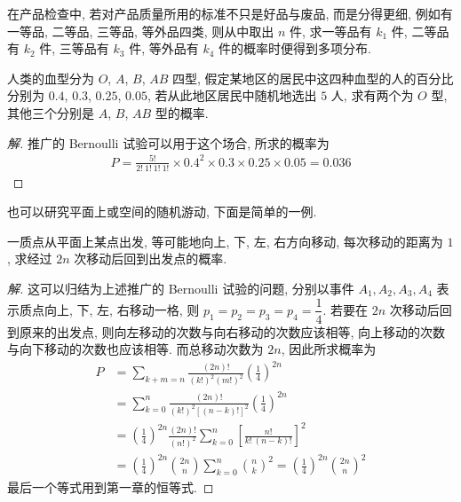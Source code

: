 \documentclass[../../main.tex]{subfiles}
\begin{document}
在产品检查中, 若对产品质量所用的标准不只是好品与废品, 而是分得更细, 例如有一等品, 二等品, 三等品, 等外品四类, 则从中取出 $n$ 件, 求一等品有 $k_1$ 件, 二等品有 $k_2$ 件, 三等品有 $k_3$ 件, 等外品有 $k_4$ 件的概率时便得到多项分布.

\begin{example}[人类血型分布]\label{example:ch02-人类血型分布}
人类的血型分为 $O$, $A$, $B$, $AB$ 四型, 假定某地区的居民中这四种血型的人的百分比分别为 $0.4$, $0.3$, $0.25$, $0.05$, 若从此地区居民中随机地选出 $5$ 人, 求有两个为 $O$ 型, 其他三个分别是 $A$, $B$, $AB$ 型的概率.

\begin{proof}[解]
推广的 Bernoulli 试验可以用于这个场合, 所求的概率为
\begin{align*}
P=\frac{5!}{2!\ 1!\ 1!\ 1!}\times 0.4^2\times 0.3\times 0.25\times 0.05=0.036
\end{align*}
\end{proof}
\end{example}

也可以研究平面上或空间的随机游动, 下面是简单的一例.

\begin{example}[平面上随机游动的返回概率]\label{example:ch02-平面随机游动返回}
一质点从平面上某点出发, 等可能地向上, 下, 左, 右方向移动, 每次移动的距离为 $1$, 求经过 $2n$ 次移动后回到出发点的概率.

\begin{proof}[解]
这可以归结为上述推广的 Bernoulli 试验的问题, 分别以事件 $A_1, A_2, A_3, A_4$ 表示质点向上, 下, 左, 右移动一格, 则 $p_1=p_2=p_3=p_4=\dfrac{1}{4}$. 若要在 $2n$ 次移动后回到原来的出发点, 则向左移动的次数与向右移动的次数应该相等, 向上移动的次数与向下移动的次数也应该相等. 而总移动次数为 $2n$, 因此所求概率为
\begin{align*}
P&=\sum_{k+m=n}\frac{(2n)!}{(k!)^2(m!)^2}\left(\frac{1}{4}\right)^{2n}\\
&=\sum_{k=0}^{n}\frac{(2n)!}{(k!)^2[(n-k)!]^2}\left(\frac{1}{4}\right)^{2n}\\
&=\left(\frac{1}{4}\right)^{2n}\frac{(2n)!}{(n!)^2}\sum_{k=0}^{n}\left[\frac{n!}{k!\ (n-k)!}\right]^2\\
&=\left(\frac{1}{4}\right)^{2n}\binom{2n}{n}\sum_{k=0}^{n}\binom{n}{k}^2=\left(\frac{1}{4}\right)^{2n}\binom{2n}{n}^2
\end{align*}
最后一个等式用到第一章的恒等式.
\end{proof}
\end{example}
\end{document}
